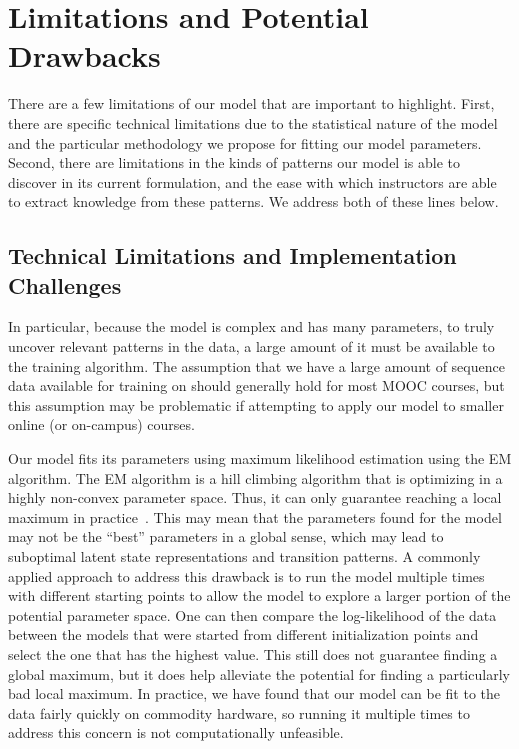\section{Limitations and Potential Drawbacks}

There are a few limitations of our model that are important to highlight.
First, there are specific technical limitations due to the statistical
nature of the model and the particular methodology we propose for fitting
our model parameters. Second, there are limitations in the kinds of
patterns our model is able to discover in its current formulation, and the
ease with which instructors are able to extract knowledge from these
patterns. We address both of these lines below.

\subsection{Technical Limitations and Implementation Challenges}
In particular, because the model is complex and has many parameters,
to truly uncover relevant patterns in the data, a large amount of it must
be available to the training algorithm. The assumption that we have a large
amount of sequence data available for training on should generally hold for
most MOOC courses, but this assumption may be problematic if attempting to
apply our model to smaller online (or on-campus) courses.

Our model fits its parameters using maximum likelihood estimation using the
EM algorithm. The EM algorithm is a hill climbing algorithm that is
optimizing in a highly non-convex parameter space. Thus, it can only
guarantee reaching a local maximum in practice~\citep{Dempster:1977:JRSS}.
This may mean that the parameters found for the model may not be the
``best'' parameters in a global sense, which may lead to suboptimal latent
state representations and transition patterns. A commonly applied approach
to address this drawback is to run the model multiple times with different
starting points to allow the model to explore a larger portion of the
potential parameter space. One can then compare the log-likelihood of the
data between the models that were started from different initialization
points and select the one that has the highest value. This still does not
guarantee finding a global maximum, but it does help alleviate the
potential for finding a particularly bad local maximum. In practice, we
have found that our model can be fit to the data fairly quickly on
commodity hardware, so running it multiple times to address this concern is
not computationally unfeasible.

